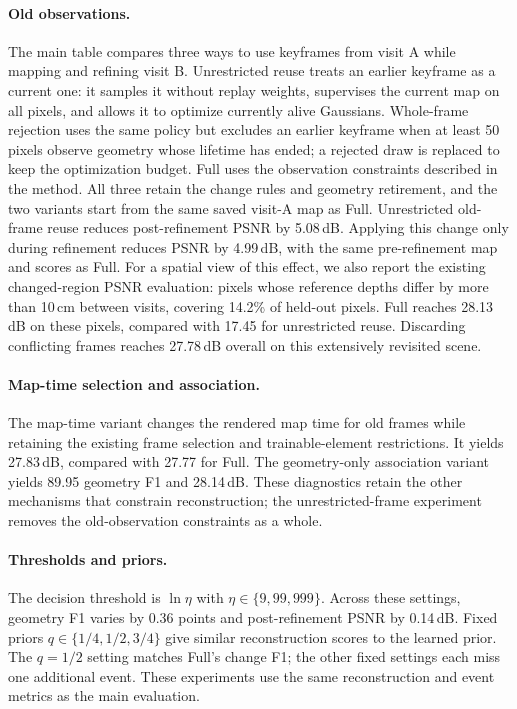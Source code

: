 \paragraph{Old observations.}
The main table compares three ways to use keyframes from visit A while mapping and refining visit B.
Unrestricted reuse treats an earlier keyframe as a current one: it samples it without replay weights,
supervises the current map on all pixels, and allows it to optimize currently alive Gaussians.
Whole-frame rejection uses the same policy but excludes an earlier keyframe when at least 50 pixels
observe geometry whose lifetime has ended; a rejected draw is replaced to keep the optimization budget.
Full uses the observation constraints described in the method. All three retain the change rules and
geometry retirement, and the two variants start from the same saved visit-A map as Full.
Unrestricted old-frame reuse reduces post-refinement PSNR by 5.08\,dB. Applying this change only during
refinement reduces PSNR by 4.99\,dB, with the same pre-refinement map and scores as Full.
For a spatial view of this effect, we also report the existing changed-region PSNR evaluation: pixels whose
reference depths differ by more than 10\,cm between visits, covering 14.2\% of held-out pixels.
Full reaches 28.13\,dB on these pixels, compared with 17.45 for unrestricted reuse.
Discarding conflicting frames reaches 27.78\,dB overall on this extensively revisited scene.

\paragraph{Map-time selection and association.}
The map-time variant changes the rendered map time for old frames while retaining the existing frame
selection and trainable-element restrictions. It yields 27.83\,dB, compared with 27.77 for Full.
The geometry-only association variant yields 89.95 geometry F1 and 28.14\,dB. These diagnostics retain the
other mechanisms that constrain reconstruction; the unrestricted-frame experiment removes the old-observation
constraints as a whole.

\paragraph{Thresholds and priors.}
The decision threshold is $\ln\eta$ with $\eta\in\{9,99,999\}$. Across these settings, geometry F1 varies by
0.36 points and post-refinement PSNR by 0.14\,dB. Fixed priors $q\in\{1/4,1/2,3/4\}$ give similar
reconstruction scores to the learned prior. The $q=1/2$ setting matches Full's change F1; the other fixed
settings each miss one additional event. These experiments use the same reconstruction and event metrics
as the main evaluation.

